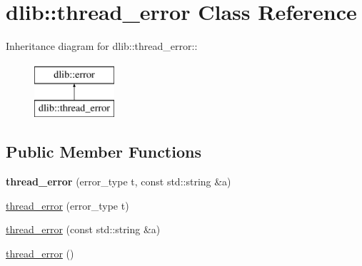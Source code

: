 \hypertarget{classdlib_1_1thread__error}{
\section{dlib::thread\_\-error Class Reference}
\label{classdlib_1_1thread__error}
}
Inheritance diagram for dlib::thread\_\-error::\begin{figure}[H]
\begin{center}
\leavevmode
\includegraphics[height=2cm]{classdlib_1_1thread__error}
\end{center}
\end{figure}
\subsection*{Public Member Functions}
\begin{DoxyCompactItemize}
\item 
\hypertarget{classdlib_1_1thread__error_a414b496b877e3f3152fd306bffd87dc1}{
{\bfseries thread\_\-error} (error\_\-type t, const std::string \&a)}
\label{classdlib_1_1thread__error_a414b496b877e3f3152fd306bffd87dc1}

\item 
\hyperlink{classdlib_1_1thread__error_ae1bb1dd5554c6a336583d70935d3d11b}{thread\_\-error} (error\_\-type t)
\item 
\hyperlink{classdlib_1_1thread__error_a8221371c972598642867232a88eeefbe}{thread\_\-error} (const std::string \&a)
\item 
\hyperlink{classdlib_1_1thread__error_a9a609b7d05a464663ebdd787b2a6e6d1}{thread\_\-error} ()
\end{DoxyCompactItemize}


